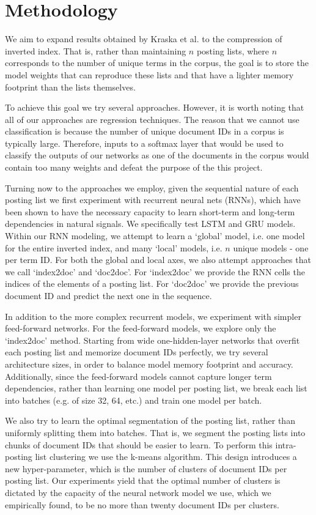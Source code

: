 \documentclass{article}
\begin{document}
\section{Methodology}\label{sec:methodology}
We aim to expand results obtained by Kraska et al. \cite{Kraska2018} to the compression of inverted index.
That is, rather than maintaining $n$ posting lists, where $n$ corresponds to the number of unique terms in the corpus, the goal is to store the model weights that can reproduce these lists and that have a lighter memory footprint than the lists themselves.

To achieve this goal we try several approaches.
However, it is worth noting that all of our approaches are regression techniques.
The reason that we cannot use classification is because the number of unique document IDs in a corpus is typically large.
Therefore, inputs to a softmax layer that would be used to classify the outputs of our networks as one of the documents in the corpus would contain too many weights and defeat the purpose of the this project.

Turning now to the approaches we employ, given the sequential nature of each posting list we first experiment with recurrent neural nets (RNNs), which have been shown to have the necessary capacity to learn short-term and long-term dependencies in natural signals.
We specifically test LSTM and GRU models.
Within our RNN modeling, we attempt to learn a `global' model, i.e. one model for the entire inverted index, and many `local' models, i.e. $n$ unique models - one per term ID.
For both the global and local axes, we also attempt approaches that we call `index2doc' and `doc2doc'.
For `index2doc' we provide the RNN cells the indices of the elements of a posting list.
For `doc2doc' we provide the previous document ID and predict the next one in the sequence.

In addition to the more complex recurrent models, we experiment with simpler feed-forward networks.
For the feed-forward models, we explore only the `index2doc' method.
Starting from wide one-hidden-layer networks that overfit each posting list and memorize document IDs perfectly, we try several architecture sizes, in order to balance model memory footprint and accuracy.
Additionally, since the feed-forward models cannot capture longer term dependencies, rather than learning one model per posting list, we break each list into batches (e.g. of size 32, 64, etc.) and train one model per batch.

We also try to learn the optimal segmentation of the posting list, rather than uniformly splitting them into batches.
That is, we segment the posting lists into chunks of document IDs that should be easier to learn.
To perform this intra-posting list clustering we use the k-means algorithm.
This design introduces a new hyper-parameter, which is the number of clusters of document IDs per posting list. Our experiments yield that the optimal number of clusters is dictated by the capacity of the neural network model we use, which we empirically found, to be no more than twenty document IDs per clusters. 
\end{document}
